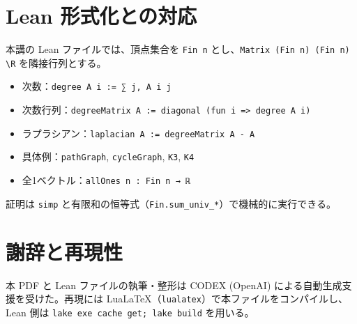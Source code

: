 \documentclass[12pt]{ltjsarticle}
\newcommand{\1}{\mathbf{1}}
\newcommand{\R}{\mathbb{R}}
\begin{document}
\section{Lean 形式化との対応}
本講の Lean ファイルでは、頂点集合を \verb|Fin n| とし、\verb|Matrix (Fin n) (Fin n) \R| を隣接行列とする。
\\[-1ex]
\begin{itemize}
  \item 次数：\verb|degree A i := ∑ j, A i j|
  \item 次数行列：\verb|degreeMatrix A := diagonal (fun i => degree A i)|
  \item ラプラシアン：\verb|laplacian A := degreeMatrix A - A|
  \item 具体例：\verb|pathGraph|, \verb|cycleGraph|, \verb|K3|, \verb|K4|
  \item 全1ベクトル：\verb|allOnes n : Fin n → ℝ|
\end{itemize}
証明は \verb|simp| と有限和の恒等式（\verb|Fin.sum_univ_*|）で機械的に実行できる。

\section*{謝辞と再現性}
本 PDF と Lean ファイルの執筆・整形は CODEX (OpenAI) による自動生成支援を受けた。再現には LuaLaTeX（\verb|lualatex|）で本ファイルをコンパイルし、Lean 側は \verb|lake exe cache get; lake build| を用いる。
\end{document}
